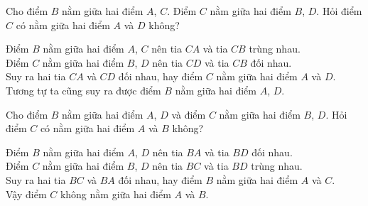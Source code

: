 \begin{vd}%
	Cho điểm $B$ nằm giữa hai điểm $A$, $C$. Điểm $C$ nằm giữa hai điểm $B$, $D$. Hỏi điểm $C$ có nằm giữa hai điểm $A$ và $D$ không?
	\loigiai
	{
		\begin{center}
		\end{center}
		Điểm $B$ nằm giữa hai điểm $A$, $C$ nên tia $CA$ và tia $CB$ trùng nhau.\\
		Điểm $C$ nằm giữa hai điểm $B$, $D$ nên tia $CD$ và tia $CB$ đối nhau.\\
		Suy ra hai tia $CA$ và $CD$ đối nhau, hay điểm $C$ nằm giữa hai điểm $A$ và $D$.\\
		Tương tự ta cũng suy ra được điểm $B$ nằm giữa hai điểm $A$, $D$.
	}
\end{vd}

\begin{vd}%
	Cho điểm $B$ nằm giữa hai điểm $A$, $D$ và điểm $C$ nằm giữa hai điểm $B$, $D$. Hỏi điểm $C$ có nằm giữa hai điểm $A$ và $B$ không?
	\loigiai
	{
		\begin{center}
		\end{center}
		Điểm $B$ nằm giữa hai điểm $A$, $D$ nên tia $BA$ và tia $BD$ đối nhau.\\
		Điểm $C$ nằm giữa hai điểm $B$, $D$ nên tia $BC$ và tia $BD$ trùng nhau.\\
		Suy ra hai tia $BC$ và $BA$ đối nhau, hay điểm $B$ nằm giữa hai điểm $A$ và $C$.\\
		Vậy điểm $C$ không nằm giữa hai điểm $A$ và $B$.
	}
\end{vd}

